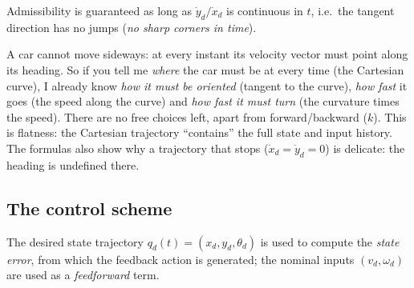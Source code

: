 \documentclass[11pt,a4paper]{article}
\def\bm#1{#1}%
\def\vect#1{#1}%
\newcommand{\vect}[1]{\bm{#1}}
\newcommand{\vd}{v_d}
\newcommand{\omd}{\omega_d}
\newcommand{\qd}{\vect{q}_d}
\theoremstyle{definition}
\theoremstyle{plain}
\theoremstyle{remark}
\begin{document}
Admissibility is guaranteed as long as $\dot y_d/\dot x_d$ is continuous in $t$, i.e.\ the tangent direction has no jumps (\emph{no sharp corners in time}).

\begin{intuition}
A car cannot move sideways: at every instant its velocity vector must point along its heading. So if you tell me \emph{where} the car must be at every time (the Cartesian curve), I already know \emph{how it must be oriented} (tangent to the curve), \emph{how fast} it goes (the speed along the curve) and \emph{how fast it must turn} (the curvature times the speed). There are no free choices left, apart from forward/backward ($k$). This is flatness: the Cartesian trajectory ``contains'' the full state and input history. The formulas also show why a trajectory that stops ($\dot x_d=\dot y_d=0$) is delicate: the heading is undefined there.
\end{intuition}

\subsection{The control scheme}

The desired state trajectory $\qd(t)=(x_d,y_d,\theta_d)$ is used to compute the \emph{state error}, from which the feedback action is generated; the nominal inputs $(\vd,\omd)$ are used as a \emph{feedforward} term.
\end{document}
